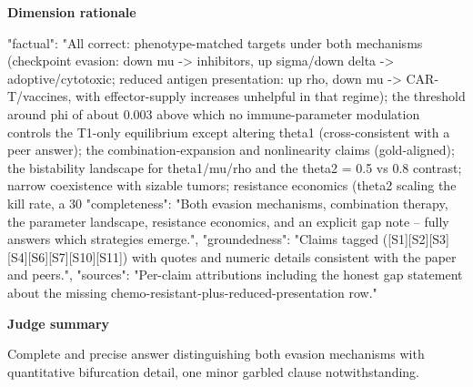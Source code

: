 \documentclass[10pt]{article}
\begin{document}
\textbf{Dimension rationale}
\begin{EvidenceText}
{
  "factual": "All correct: phenotype-matched targets under both mechanisms (checkpoint evasion: down mu -> inhibitors, up sigma/down delta -> adoptive/cytotoxic; reduced antigen presentation: up rho, down mu -> CAR-T/vaccines, with effector-supply increases unhelpful in that regime); the threshold around phi of about 0.003 above which no immune-parameter modulation controls the T1-only equilibrium except altering theta1 (cross-consistent with a peer answer); the combination-expansion and nonlinearity claims (gold-aligned); the bistability landscape for theta1/mu/rho and the theta2 = 0.5 vs 0.8 contrast; narrow coexistence with sizable tumors; resistance economics (theta2 scaling the kill rate, a 30%
  "completeness": "Both evasion mechanisms, combination therapy, the parameter landscape, resistance economics, and an explicit gap note -- fully answers which strategies emerge.",
  "groundedness": "Claims tagged ([S1][S2][S3][S4][S6][S7][S10][S11]) with quotes and numeric details consistent with the paper and peers.",
  "sources": "Per-claim attributions including the honest gap statement about the missing chemo-resistant-plus-reduced-presentation row."
}
\end{EvidenceText}

\textbf{Judge summary}
\begin{EvidenceText}
Complete and precise answer distinguishing both evasion mechanisms with quantitative bifurcation detail, one minor garbled clause notwithstanding.
\end{EvidenceText}
\end{document}
